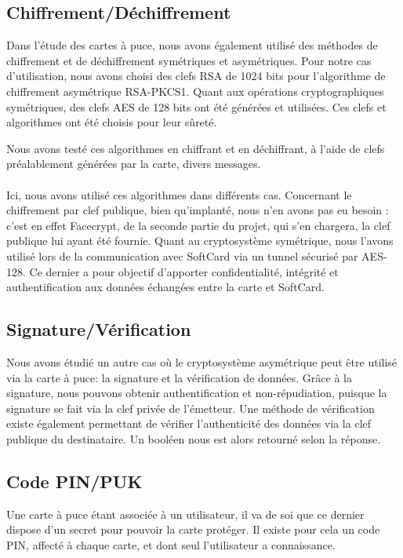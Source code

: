 \documentclass[a4paper,11pt,french]{article}
\begin{document}
\subsection{Chiffrement/Déchiffrement}
Dans l'étude des cartes à puce, nous avons également utilisé des méthodes de 
chiffrement et de déchiffrement symétriques et asymétriques. Pour notre cas 
d'utilisation, nous avons choisi des clefs RSA de 1024 bits pour l'algorithme de
chiffrement asymétrique RSA-PKCS1. Quant aux opérations cryptographiques 
symétriques, des clefs AES de 128 bits ont été générées et utilisées. Ces clefs
et algorithmes ont été choisis pour leur sûreté.

Nous avons testé ces algorithmes en chiffrant et en déchiffrant, à l'aide de 
clefs préalablement générées par la carte, divers messages. 

\paragraph{}
Ici, nous avons utilisé ces algorithmes dans différents cas. Concernant
le chiffrement par clef publique, bien qu'implanté, nous n'en avons pas eu 
besoin : c'est en effet Facecrypt, de la seconde partie du projet, qui s'en 
chargera, la clef publique lui ayant été fournie. Quant au cryptosystème 
symétrique, nous l'avons utilisé lors de la communication avec SoftCard
via un \og{}tunnel \fg{} sécurisé par AES-128. Ce dernier a pour objectif d'apporter 
confidentialité, intégrité et authentification aux données échangées entre la 
carte et SoftCard.

\subsection{Signature/Vérification}
Nous avons étudié un autre cas où le cryptosystème asymétrique peut être utilisé
via la carte à puce: la signature et la vérification de données. Grâce à la 
signature, nous pouvons obtenir authentification et non-répudiation, puisque la
signature se fait via la clef privée de l'émetteur. Une méthode de vérification
existe également permettant de vérifier l'authenticité des données via la clef 
publique du destinataire. Un booléen nous est alors retourné selon la réponse.

\label{CodePIN}
\subsection{Code PIN/PUK}
Une carte à puce étant associée à un utilisateur, il va de soi que ce dernier 
dispose d'un secret pour pouvoir la carte protéger. Il existe pour cela un code 
PIN, affecté à chaque carte, et dont seul l'utilisateur a connaissance.
\end{document}
